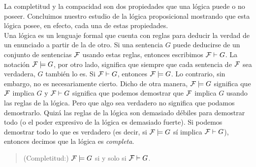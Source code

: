 \message{ !name(main.tex)}\documentclass[12pt,a4paper]{book}
\begin{document}
    La completitud y la compacidad son dos propiedades que una lógica puede o no poseer. Concluimos nuestro estudio de la
    lógica proposicional mostrando que esta lógica posee, en efecto, cada una de estas propiedades.\\
    Una lógica es un lenguaje formal que cuenta con reglas para deducir la verdad de un enunciado a partir de la de otro. Si
    una sentencia $G$ puede deducirse de un conjunto de sentencias $\mathcal{F}$ usando estas reglas, entonces escribimos
    $\mathcal{F}\vdash G$. La notación $\mathcal{F}\models G$, por otro lado, significa que siempre que cada sentencia de $\mathcal{F}$ sea
    verdadera, $G$ también lo es. Si $\mathcal{F}\vdash G$, entonces $\mathcal{F}\models G$. Lo contrario, sin embargo, no es
    necesariamente cierto. Dicho de otra manera, $\mathcal{F}\models G$ significa que $\mathcal{F}$ implica $G$ y $\mathcal{F}\vdash G$ significa que
    podemos demostrar que $\mathcal{F}$ implica $G$ usando las reglas de la lógica. Pero que algo sea verdadero no significa que
    podamos demostrarlo. Quizá las reglas de la lógica son demasiado débiles para demostrar todo (o el poder expresivo de la
    lógica es demasiado fuerte). Si podemos demostrar todo lo que es verdadero (es decir, si $\mathcal{F}\models G$ sí implica
    $\mathcal{F}\vdash G$), entonces decimos que la lógica es \textit{completa}.

    \begin{quote}
        (Completitud:) $\mathcal{F}\models G$ si y solo si $\mathcal{F}\vdash G$.
    \end{quote}
\end{document}
